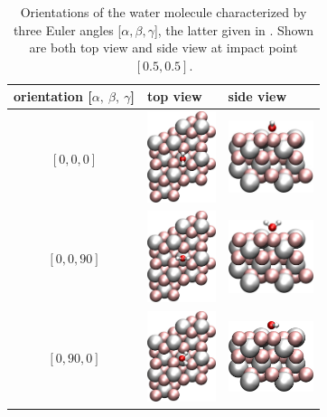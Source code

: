 \documentclass[11pt,DIV=13,BCOR=5mm,a4paper,headinclude]{scrbook}
\begin{document}
 \begin{table}[!h]
 \centering
  \caption{Orientations of the water molecule characterized by three Euler angles [$\alpha,\beta,\gamma$], the latter given in \textdegree.
Shown are both top view and side view at impact point $[0.5,0.5]$.} %
 \begin{tabular}{cp{4cm}p{4cm}}
 \toprule
orientation [$\alpha,~\beta,~\gamma$]& top view & side view \\\midrule
$[0, 0, 0]$  & \includegraphics[width=2cm,angle=90]{figures/0001/Ausrichtungsbilder/0_0_0-toptest.png}
&\includegraphics[width=2.5cm]{figures/0001/Ausrichtungsbilder/0_0_0-sidetest.png}\\
$[0, 0, 90]$   & \includegraphics[width=2cm,angle=90]{figures/0001/Ausrichtungsbilder/0_0_90-toptest.png}
& \includegraphics[width=2.5cm]{figures/0001/Ausrichtungsbilder/0_0_90-sidetest.png}\\
$[0, 90, 0]$   & \includegraphics[width=2cm,angle=90]{figures/0001/Ausrichtungsbilder/0_90_0-toptest.png}
& \includegraphics[width=2.5cm]{figures/0001/Ausrichtungsbilder/0_90_0-sidetest.png}\\

\end{tabular}
\end{table}
\end{document}
